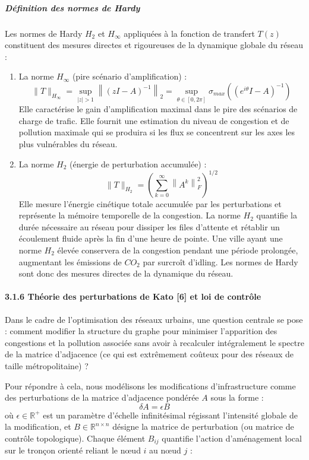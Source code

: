 \documentclass[10pt, a4paper]{article}
\begin{document}
\subparagraph{Définition des normes de
Hardy}\label{duxe9finition-des-normes-de-hardy}

Les normes de Hardy \(H_2\) et \(H_\infty\) appliquées à la fonction de
transfert \(T(z)\) constituent des mesures directes et rigoureuses de la
dynamique globale du réseau :

\begin{enumerate}
\def\labelenumi{\arabic{enumi}.}
\item
  La norme \(H_\infty\) (pire scénario d'amplification) :
  \[\|T\|_{H_\infty} = \sup_{|z| > 1} \left\| (zI - A)^{-1} \right\|_2 = \sup_{\theta \in [0, 2\pi]} \sigma_{max}\left( (e^{i\theta}I - A)^{-1} \right)\]
  Elle caractérise le gain d'amplification maximal dans le pire des
  scénarios de charge de trafic. Elle fournit une estimation du niveau
  de congestion et de pollution maximale qui se produira si les flux se
  concentrent sur les axes les plus vulnérables du réseau.
\item
  La norme \(H_2\) (énergie de perturbation accumulée) :
  \[\|T\|_{H_2} = \left( \sum_{k=0}^{\infty} \left\| A^k \right\|_F^2 \right)^{1/2}\]
  Elle mesure l'énergie cinétique totale accumulée par les perturbations
  et représente la mémoire temporelle de la congestion. La norme \(H_2\)
  quantifie la durée nécessaire au réseau pour dissiper les files
  d'attente et rétablir un écoulement fluide après la fin d'une heure de
  pointe. Une ville ayant une norme \(H_2\) élevée conservera de la
  congestion pendant une période prolongée, augmentant les émissions de
  \(CO_2\) par surcroît d'idling. Les normes de Hardy sont donc des
  mesures directes de la dynamique du réseau.
\end{enumerate}

\paragraph{3.1.6 Théorie des perturbations de Kato {[}6{]} et loi de
contrôle}\label{thuxe9orie-des-perturbations-de-kato-6-et-loi-de-contruxf4le}

Dans le cadre de l'optimisation des réseaux urbains, une question
centrale se pose : comment modifier la structure du graphe pour
minimiser l'apparition des congestions et la pollution associée sans
avoir à recalculer intégralement le spectre de la matrice d'adjacence
(ce qui est extrêmement coûteux pour des réseaux de taille
métropolitaine) ?

Pour répondre à cela, nous modélisons les modifications d'infrastructure
comme des perturbations de la matrice d'adjacence pondérée \(A\) sous la
forme : \[\delta A = \epsilon B\] où \(\epsilon \in \mathbb{R}^+\) est
un paramètre d'échelle infinitésimal régissant l'intensité globale de la
modification, et \(B \in \mathbb{R}^{n \times n}\) désigne la matrice de
perturbation (ou matrice de contrôle topologique). Chaque élément
\(B_{ij}\) quantifie l'action d'aménagement local sur le tronçon orienté
reliant le nœud \(i\) au nœud \(j\) :
\end{document}
